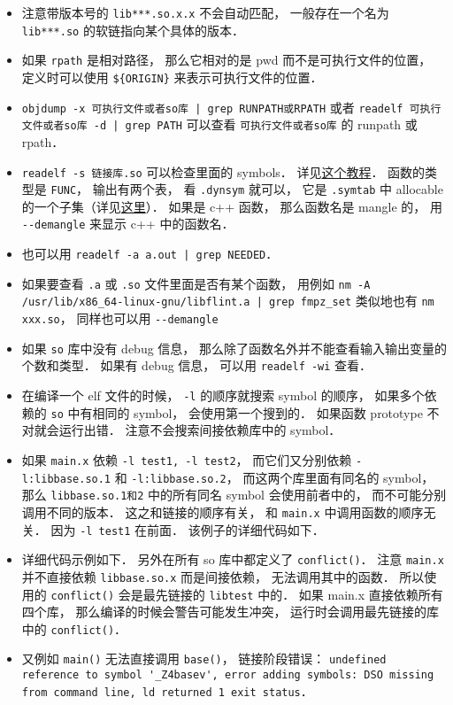 \begin{itemize}
\item 注意带版本号的 \verb|lib***.so.x.x| 不会自动匹配， 一般存在一个名为 \verb|lib***.so| 的软链指向某个具体的版本．
\item 如果 \verb|rpath| 是相对路径， 那么它相对的是 pwd 而不是可执行文件的位置， 定义时可以使用 \verb|${ORIGIN}| 来表示可执行文件的位置．
\item \verb`objdump -x 可执行文件或者so库 | grep RUNPATH或RPATH` 或者 \verb`readelf 可执行文件或者so库 -d | grep PATH` 可以查看 \verb|可执行文件或者so库| 的 runpath 或 rpath．
\item \verb|readelf -s 链接库.so| 可以检查里面的 symbols． 详见\href{https://amir.rachum.com/blog/2016/09/17/shared-libraries/}{这个教程}． 函数的类型是 \verb|FUNC|， 输出有两个表， 看 \verb|.dynsym| 就可以， 它是 \verb|.symtab| 中 allocable 的一个子集（详见\href{https://blogs.oracle.com/solaris/post/inside-elf-symbol-tables}{这里}）． 如果是 c++ 函数， 那么函数名是 mangle 的， 用 \verb|--demangle| 来显示 c++ 中的函数名．
\item 也可以用 \verb`readelf -a a.out | grep NEEDED`．
\item 如果要查看 \verb|.a| 或 \verb|.so| 文件里面是否有某个函数， 用例如 \verb`nm -A /usr/lib/x86_64-linux-gnu/libflint.a | grep fmpz_set` 类似地也有 \verb|nm xxx.so|， 同样也可以用 \verb|--demangle|
\item 如果 \verb|so| 库中没有 debug 信息， 那么除了函数名外并不能查看输入输出变量的个数和类型． 如果有 debug 信息， 可以用 \verb|readelf -wi| 查看．
\item 在编译一个 elf 文件的时候， \verb|-l| 的顺序就搜索 symbol 的顺序， 如果多个依赖的 \verb|so| 中有相同的 symbol， 会使用第一个搜到的． 如果函数 prototype 不对就会运行出错． 注意不会搜索间接依赖库中的 symbol．
\item 如果 \verb|main.x| 依赖 \verb|-l test1, -l test2|， 而它们又分别依赖 \verb|-l:libbase.so.1| 和 \verb|-l:libbase.so.2|， 而这两个库里面有同名的 symbol， 那么 \verb|libbase.so.1和2| 中的所有同名 symbol 会使用前者中的， 而不可能分别调用不同的版本． 这之和链接的顺序有关， 和 \verb|main.x| 中调用函数的顺序无关． 因为 \verb|-l test1| 在前面． 该例子的详细代码如下．
\item 详细代码示例如下． 另外在所有 so 库中都定义了 \verb|conflict()|． 注意 \verb|main.x| 并不直接依赖 \verb|libbase.so.x| 而是间接依赖， 无法调用其中的函数． 所以使用的 \verb|conflict()| 会是最先链接的 \verb|libtest| 中的． 如果 main.x 直接依赖所有四个库， 那么编译的时候会警告可能发生冲突， 运行时会调用最先链接的库中的 \verb|conflict()|．
\item 又例如 \verb|main()| 无法直接调用 \verb|base()|， 链接阶段错误： \verb|undefined reference to symbol '_Z4basev', error adding symbols: DSO missing from command line, ld returned 1 exit status|．
\end{itemize}

